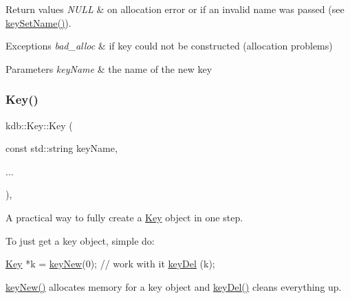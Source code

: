 \begin{DoxyRetVals}{Return values}
{\em N\+U\+LL} & on allocation error or if an invalid {\ttfamily name} was passed (see \hyperlink{group__keyname_ga7699091610e7f3f43d2949514a4b35d9}{key\+Set\+Name()}).\\
\hline
\end{DoxyRetVals}

\begin{DoxyExceptions}{Exceptions}
{\em bad\+\_\+alloc} & if key could not be constructed (allocation problems)\\
\hline
\end{DoxyExceptions}

\begin{DoxyParams}{Parameters}
{\em key\+Name} & the name of the new key \\
\hline
\end{DoxyParams}
\mbox{\label{classkdb_1_1Key_acbf7642258d46da2c4427f4104cf01ee}} 
\subsubsection{\texorpdfstring{Key()}{Key()}\hspace{0.1cm}{\footnotesize\ttfamily [6/7]}}
{\footnotesize\ttfamily kdb\+::\+Key\+::\+Key (\begin{DoxyParamCaption}\item[{const std\+::string}]{key\+Name,  }\item[{}]{... }\end{DoxyParamCaption})\hspace{0.3cm}{\ttfamily [inline]}, {\ttfamily [explicit]}}



A practical way to fully create a \hyperlink{classkdb_1_1Key}{Key} object in one step. 

To just get a key object, simple do\+:


\begin{DoxyCodeInclude}
\hyperlink{classkdb_1_1Key_a5679f5cae63caddd64a60388b9cc77fa}{Key} *k = \hyperlink{group__key_gad23c65b44bf48d773759e1f9a4d43b89}{keyNew}(0);
\textcolor{comment}{// work with it}
\hyperlink{group__key_ga3df95bbc2494e3e6703ece5639be5bb1}{keyDel} (k);
\end{DoxyCodeInclude}
 \hyperlink{group__key_gad23c65b44bf48d773759e1f9a4d43b89}{key\+New()} allocates memory for a key object and \hyperlink{group__key_ga3df95bbc2494e3e6703ece5639be5bb1}{key\+Del()} cleans everything up.

